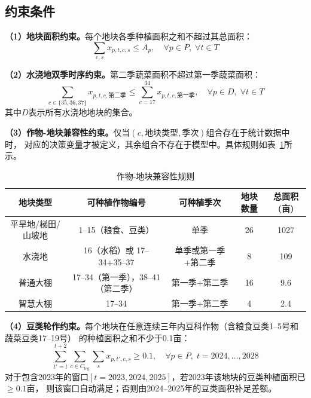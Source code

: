 \documentclass[12pt,a4paper]{ctexart}
\begin{document}
\subsection{约束条件}

\textbf{（1）地块面积约束。}每个地块各季种植面积之和不超过其总面积：
\begin{equation}\label{eq:area}
\sum_{c,s} x_{p,t,c,s} \leq A_p, \quad \forall p \in P,\; \forall t \in T
\end{equation}

\textbf{（2）水浇地双季时序约束。}第二季蔬菜面积不超过第一季蔬菜面积：
\begin{equation}\label{eq:shuijiao}
\sum_{c \in \{35,36,37\}} x_{p,t,c,\text{第二季}} \leq \sum_{c=17}^{34} x_{p,t,c,\text{第一季}}, \quad \forall p \in D,\; \forall t \in T
\end{equation}
其中$D$表示所有水浇地地块的集合。

\textbf{（3）作物-地块兼容性约束。}仅当$(c, \text{地块类型}, \text{季次})$组合存在于统计数据中时，
对应的决策变量才被定义，其余组合不存在于模型中。具体规则如表~\ref{tab:compatibility}所示。

\begin{table}[H]
\centering
\caption{作物-地块兼容性规则}
\label{tab:compatibility}
\begin{tabular}{ccccc}
\toprule
\textbf{地块类型} & \textbf{可种植作物编号} & \textbf{可种植季次} & \textbf{地块数量} & \textbf{总面积(亩)} \\
\midrule
平旱地/梯田/山坡地 & 1--15（粮食、豆类） & 单季 & 26 & 1027 \\
水浇地 & 16（水稻）或 17--34+35--37 & 单季或第一季+第二季 & 8 & 109 \\
普通大棚 & 17--34（第一季），38--41（第二季） & 第一季+第二季 & 16 & 9.6 \\
智慧大棚 & 17--34 & 第一季+第二季 & 4 & 2.4 \\
\bottomrule
\end{tabular}
\end{table}

\textbf{（4）豆类轮作约束。}每个地块在任意连续三年内豆科作物（含粮食豆类1--5号和蔬菜豆类17--19号）
的种植面积之和不少于0.1亩：
\begin{equation}\label{eq:rotation}
\sum_{t'=t}^{t+2} \sum_{c \in C_{\text{leg}}} \sum_{s} x_{p,t',c,s} \geq 0.1, \quad \forall p \in P,\; t = 2024,\dots,2028
\end{equation}
对于包含2023年的窗口$[t=2023, 2024, 2025]$，若2023年该地块的豆类种植面积已$\geq 0.1$亩，
则该窗口自动满足；否则由2024--2025年的豆类面积补足差额。
\end{document}
